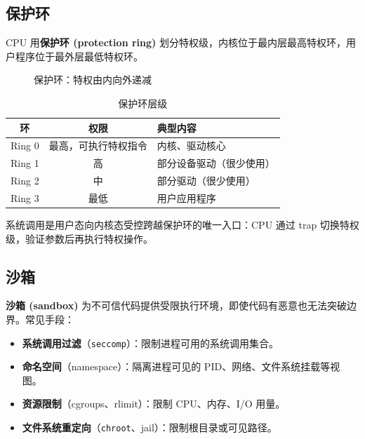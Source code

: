 \subsection{保护环}

CPU 用\textbf{保护环 (protection ring)} 划分特权级，内核位于最内层最高特权环，用户程序位于最外层最低特权环。

\begin{figure}[H]
\centering
{}
\caption{保护环：特权由内向外递减}
\end{figure}

\begin{table}[H]
\centering
\caption{保护环层级}
\begin{tabulary}{\textwidth}{CCL}
\toprule
环 & 权限 & 典型内容 \\
\midrule
Ring 0 & 最高，可执行特权指令 & 内核、驱动核心 \\
Ring 1 & 高 & 部分设备驱动（很少使用） \\
Ring 2 & 中 & 部分驱动（很少使用） \\
Ring 3 & 最低 & 用户应用程序 \\
\bottomrule
\end{tabulary}
\end{table}

\noindent 系统调用是用户态向内核态受控跨越保护环的唯一入口：CPU 通过 trap 切换特权级，验证参数后再执行特权操作。

\subsection{沙箱}

\textbf{沙箱 (sandbox)} 为不可信代码提供受限执行环境，即使代码有恶意也无法突破边界。常见手段：

\begin{itemize}
    \item \textbf{系统调用过滤}（\texttt{seccomp}）：限制进程可用的系统调用集合。
    \item \textbf{命名空间}（namespace）：隔离进程可见的 PID、网络、文件系统挂载等视图。
    \item \textbf{资源限制}（cgroups、rlimit）：限制 CPU、内存、I/O 用量。
    \item \textbf{文件系统重定向}（\texttt{chroot}、jail）：限制根目录或可见路径。
\end{itemize}

